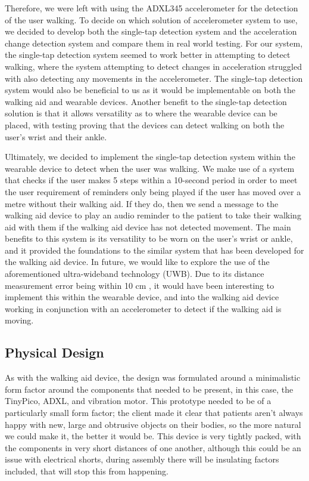            Therefore, we were left with using the ADXL345 accelerometer for the detection of the user walking. To decide on which solution of accelerometer system to use, we decided to develop both the single-tap detection system and the acceleration change detection system and compare them in real world testing. For our system, the single-tap detection system seemed to work better in attempting to detect walking, where the system attempting to detect changes in acceleration struggled with also detecting any movements in the accelerometer. The single-tap detection system would also be beneficial to us as it would be implementable on both the walking aid and wearable devices. Another benefit to the single-tap detection solution is that it allows versatility as to where the wearable device can be placed, with testing proving that the devices can detect walking on both the user's wrist and their ankle. 

           Ultimately, we decided to implement the single-tap detection system within the wearable device to detect when the user was walking. We make use of a system that checks if the user makes 5 steps within a 10-second period in order to meet the user requirement of reminders only being played if the user has moved over a metre without their walking aid. If they do, then we send a message to the walking aid device to play an audio reminder to the patient to take their walking aid with them if the walking aid device has not detected movement. The main benefits to this system is its versatility to be worn on the user's wrist or ankle, and it provided the foundations to the similar system that has been developed for the walking aid device. In future, we would like to explore the use of the aforementioned ultra-wideband technology (UWB). Due to its distance measurement error being within 10 cm \cite{uwb_accuracy}, it would have been interesting to implement this within the wearable device, and into the walking aid device working in conjunction with an accelerometer to detect if the walking aid is moving.

        \subsection{Physical Design}
        \label{subsec:Design_Decisions_wearable}

            As with the walking aid device, the design was formulated around a minimalistic form factor around the components that needed to be present, in this case, the TinyPico, ADXL, and vibration motor. This prototype needed to be of a particularly small form factor; the client made it clear that patients aren't always happy with new, large and obtrusive objects on their bodies, so the more natural we could make it, the better it would be. This device is very tightly packed, with the components in very short distances of one another, although this could be an issue with electrical shorts, during assembly there will be insulating factors included, that will stop this from happening.

